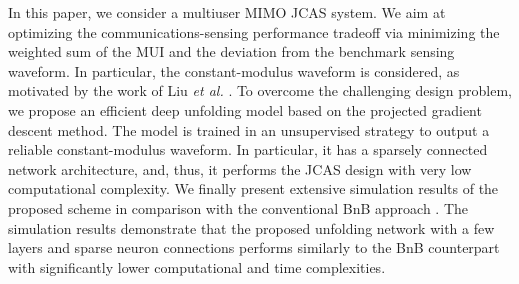 \documentclass[conference]{IEEEtran}
\begin{document}
In this paper, we consider a multiuser MIMO JCAS system. We aim at optimizing the communications-sensing performance tradeoff via minimizing the weighted sum of the MUI and the deviation from the benchmark sensing waveform. In particular, the constant-modulus waveform is considered, as motivated by the work of Liu \textit{et al.} \cite{liu2018toward}. To overcome the challenging design problem, we propose an efficient deep unfolding model based on the projected gradient descent method. The model is trained in an unsupervised strategy to output a reliable constant-modulus waveform. In particular, it has a sparsely connected network architecture, and, thus, it performs the JCAS design with very low computational complexity. %
We finally present extensive simulation results of the proposed scheme in comparison with the conventional BnB approach \cite{8386661}. The simulation results demonstrate that the proposed unfolding network with a few layers and sparse neuron connections performs similarly to the BnB counterpart with significantly lower computational and time complexities.%
\end{document}
